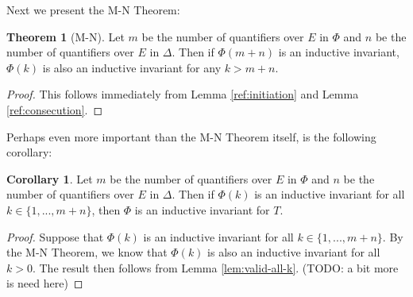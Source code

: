 \documentclass[12pt]{article}
\theoremstyle{definition}
\newtheorem{corollary}{Corollary}
\newtheorem{theorem}{Theorem}
\theoremstyle{remark}
\begin{document}
Next we present the M-N Theorem:

\begin{theorem}[M-N]
  Let $m$ be the number of quantifiers over $E$ in $\Phi$ and $n$ be the number of quantifiers over $E$ in $\Delta$.  Then if $\Phi(m+n)$ is an inductive invariant, $\Phi(k)$ is also an inductive invariant for any $k>m+n$.
\end{theorem}
\begin{proof}
  This follows immediately from Lemma \ref{ref:initiation} and Lemma \ref{ref:consecution}.
\end{proof}

Perhaps even more important than the M-N Theorem itself, is the following corollary:

\begin{corollary}
  Let $m$ be the number of quantifiers over $E$ in $\Phi$ and $n$ be the number of quantifiers over $E$ in $\Delta$.  Then if $\Phi(k)$ is an inductive invariant for all $k \in \{1,...,m+n\}$, then $\Phi$ is an inductive invariant for $T$.
\end{corollary}
\begin{proof}
  Suppose that $\Phi(k)$ is an inductive invariant for all $k \in \{1,...,m+n\}$.  By the M-N Theorem, we know that $\Phi(k)$ is also an inductive invariant for all $k>0$.  The result then follows from Lemma \ref{lem:valid-all-k}.  (TODO: a bit more is need here)
\end{proof}





\end{document}
